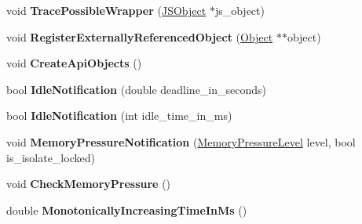 \begin{DoxyCompactItemize}
\item 
void {\bfseries Trace\+Possible\+Wrapper} (\hyperlink{classv8_1_1internal_1_1_j_s_object}{J\+S\+Object} $\ast$js\+\_\+object)\hypertarget{classv8_1_1internal_1_1_heap_a281dcf956dc2dbf6a366592646332124}{}\label{classv8_1_1internal_1_1_heap_a281dcf956dc2dbf6a366592646332124}

\item 
void {\bfseries Register\+Externally\+Referenced\+Object} (\hyperlink{classv8_1_1internal_1_1_object}{Object} $\ast$$\ast$object)\hypertarget{classv8_1_1internal_1_1_heap_a7c5b86a3238d733eaa9634143d77535a}{}\label{classv8_1_1internal_1_1_heap_a7c5b86a3238d733eaa9634143d77535a}

\item 
void {\bfseries Create\+Api\+Objects} ()\hypertarget{classv8_1_1internal_1_1_heap_a163f0b10bc2294ed52a2d6bc3acdc332}{}\label{classv8_1_1internal_1_1_heap_a163f0b10bc2294ed52a2d6bc3acdc332}

\item 
bool {\bfseries Idle\+Notification} (double deadline\+\_\+in\+\_\+seconds)\hypertarget{classv8_1_1internal_1_1_heap_a86bc3bf078afcba4fc8fce74b6a719de}{}\label{classv8_1_1internal_1_1_heap_a86bc3bf078afcba4fc8fce74b6a719de}

\item 
bool {\bfseries Idle\+Notification} (int idle\+\_\+time\+\_\+in\+\_\+ms)\hypertarget{classv8_1_1internal_1_1_heap_ab09bb96bf651ff735bee6cad4ac9231b}{}\label{classv8_1_1internal_1_1_heap_ab09bb96bf651ff735bee6cad4ac9231b}

\item 
void {\bfseries Memory\+Pressure\+Notification} (\hyperlink{namespacev8_ae0e9a25bf51e518585f555806e7dc7b9}{Memory\+Pressure\+Level} level, bool is\+\_\+isolate\+\_\+locked)\hypertarget{classv8_1_1internal_1_1_heap_afa44363b61a017c76f26d6761d20e8a5}{}\label{classv8_1_1internal_1_1_heap_afa44363b61a017c76f26d6761d20e8a5}

\item 
void {\bfseries Check\+Memory\+Pressure} ()\hypertarget{classv8_1_1internal_1_1_heap_a53b67fd5f8cba84b479037cd33ac9b9a}{}\label{classv8_1_1internal_1_1_heap_a53b67fd5f8cba84b479037cd33ac9b9a}

\item 
double {\bfseries Monotonically\+Increasing\+Time\+In\+Ms} ()\hypertarget{classv8_1_1internal_1_1_heap_aba15a8e74ad01511849eccc4d458e97a}{}\label{classv8_1_1internal_1_1_heap_aba15a8e74ad01511849eccc4d458e97a}


\end{DoxyCompactItemize}
